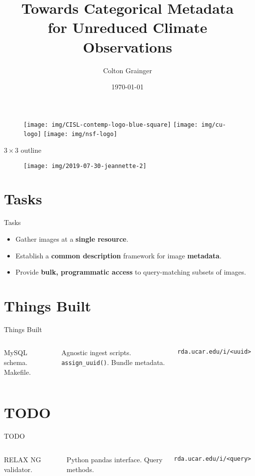\documentclass{beamer}
\title{Towards Categorical Metadata\\ for Unreduced Climate Observations}
\author{Colton Grainger}
\institute{University of Colorado}
\date{\today}
\begin{document}
\begin{frame}
  \titlepage

\vfill
\begin{figure}
    \texttt{[image: img/CISL-contemp-logo-blue-square]}\hspace{0.5em}
    \texttt{[image: img/cu-logo]}\hspace{0.5em}
    \texttt{[image: img/nsf-logo]}
\end{figure}
\end{frame}

\begin{frame}{$3 \times 3$ outline}
  \tableofcontents
    \begin{figure}
        \texttt{[image: img/2019-07-30-jeannette-2]}
    \end{figure}
\end{frame}

\section{Tasks}

\begin{frame}{Tasks}
    \begin{itemize}
        \item Gather images at a \textbf{single resource}.
        \item Establish a \textbf{common description} framework for image \textbf{metadata}.
        \item Provide \textbf{bulk, programmatic access} to query-matching subsets of images.
	\end{itemize}
\end{frame}

\section{Things Built}

\begin{frame}{Things Built}
	\begin{columns}
        MySQL schema. Makefile.

        Agnostic ingest scripts.
        \texttt{assign\_uuid()}.
        Bundle metadata.

        \texttt{rda.ucar.edu/i/<uuid>}
	\end{columns}
\end{frame}

\section{TODO}

\begin{frame}{TODO}
	\begin{columns}
		\column{.33\textwidth}
        RELAX NG validator.

        Python pandas interface.
        Query methods.

        \texttt{rda.ucar.edu/i/<query>}
	\end{columns}
\end{frame}
\end{document}
